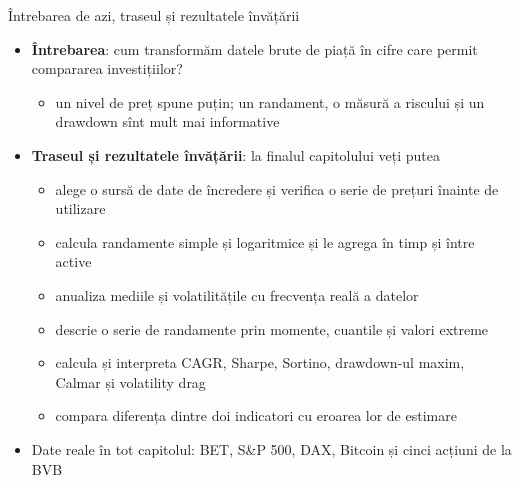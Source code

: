 \begin{frame}{Întrebarea de azi, traseul și rezultatele învățării}
\itemsize{\small}
\begin{itemize}
    \item \textbf{Întrebarea}: cum transformăm datele brute de piață în cifre care permit compararea investițiilor?
    \begin{itemize}
        \item un nivel de preț spune puțin; un randament, o măsură a riscului și un drawdown sînt mult mai informative
    \end{itemize}
    \item \textbf{Traseul și rezultatele învățării}: la finalul capitolului veți putea
    \begin{itemize}
        \item alege o sursă de date de încredere și verifica o serie de prețuri înainte de utilizare
        \item calcula randamente simple și logaritmice și le agrega în timp și între active
        \item anualiza mediile și volatilitățile cu frecvența reală a datelor
        \item descrie o serie de randamente prin momente, cuantile și valori extreme
        \item calcula și interpreta CAGR, Sharpe, Sortino, drawdown-ul maxim, Calmar și volatility drag
        \item compara diferența dintre doi indicatori cu eroarea lor de estimare
    \end{itemize}
    \item Date reale în tot capitolul: BET, S\&P 500, DAX, Bitcoin și cinci acțiuni de la BVB
\end{itemize}
\end{frame}

